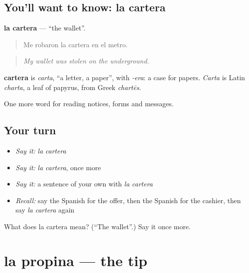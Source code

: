 \subsection*{You'll want to know: la cartera}
\textbf{la cartera} — \textquotedblleft{}the wallet\textquotedblright{}.

\begin{quote}
Me robaron la cartera en el metro.
\end{quote}

\begin{quote}
\emph{My wallet was stolen on the underground.}
\end{quote}

\begin{cousinweb}
\textbf{cartera} is \emph{carta}, \textquotedblleft{}a letter, a paper\textquotedblright{}, with \emph{-era}: a case for papers. \emph{Carta} is Latin \emph{charta}, a leaf of papyrus, from Greek \emph{chartēs}.
\end{cousinweb}

\begin{grammarlens}[title={What you've built}]
One more word for reading notices, forms and messages.
\end{grammarlens}

\subsection*{Your turn}
\begin{itemize}
\raggedright
  \item \emph{Say it:} \emph{la cartera}
  \item \emph{Say it:} \emph{la cartera}, once more
  \item \emph{Say it:} a sentence of your own with \emph{la cartera}
  \item \emph{Recall:} say the Spanish for the offer, then the Spanish for the cashier, then say \emph{la cartera} again
\end{itemize}

\begin{tcolorbox}[breakable,colback=teal!4,colframe=teal!35!black,title={Before you move on}]
What does la cartera mean? (\textquotedblleft{}The wallet\textquotedblright{}.) Say it once more.
\end{tcolorbox}
\section[la propina]{la propina — the tip}

